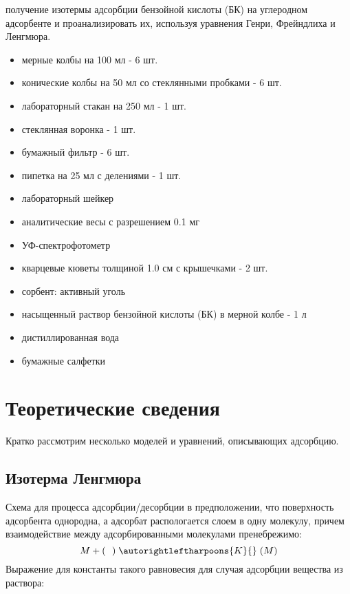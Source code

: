 \documentclass[a4paper]{article}
\begin{document}
	\newpage
\par
	\large \textbf{} получение изотермы адсорбции бензойной кислоты (БК) на углеродном адсорбенте и проанализировать их, используя уравнения Генри, Фрейндлиха и Ленгмюра.
	\par \vspace{0.3 cm}
	\textbf{}
        \begin{itemize}
           \item мерные колбы на 100 мл - 6 шт.
           \item конические колбы на 50 мл со стеклянными пробками - 6 шт.
           \item лабораторный стакан на 250 мл - 1 шт.
           \item стеклянная воронка - 1 шт.
           \item бумажный фильтр - 6 шт.
           \item пипетка на 25 мл с делениями - 1 шт.
           \item лабораторный шейкер 
           \item аналитические весы с разрешением 0.1 мг
           \item УФ-спектрофотометр
           \item кварцевые кюветы толщиной 1.0 см с крышечками - 2 шт.
           \item сорбент: активный уголь
           \item насыщенный раствор бензойной кислоты (БК) в мерной колбе - 1 л
           \item дистиллированная вода
           \item бумажные салфетки
        \end{itemize}  
\vspace{0.3 cm}
	\section{\LARGE \textbf{Теоретические сведения}}
Кратко рассмотрим несколько моделей и уравнений, описывающих адсорбцию. \par
\subsection{\large{Изотерма Ленгмюра}} \par
Схема для процесса адсорбции/десорбции в предположении, что поверхность адсорбента однородна, а адсорбат распологается слоем в одну молекулу, причем взаимодействие между адсорбированными молекулами пренебрежимо:
\LARGE \[ M + (\ \ ) \;\autorightleftharpoons{K}{}\; (M)\]
\large Выражение для константы такого равновесия для случая адсорбции вещества из раствора: \par \vspace{0.3 cm}
\end{document}
